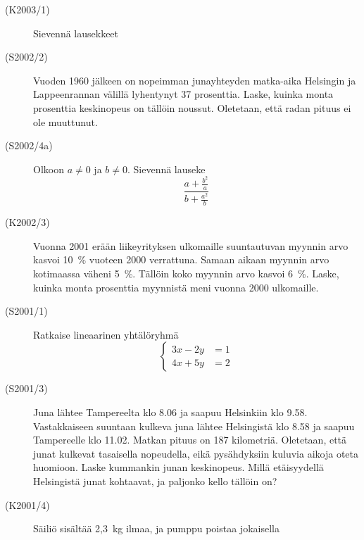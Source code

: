 \begin{description}
    \item[(K2003/1)]   Sievennä lausekkeet
        \begin{alakohdat}
        \end{alakohdat}
    \item[(S2002/2)]   Vuoden 1960 jälkeen on nopeimman junayhteyden matka-aika Helsingin ja Lappeenrannan välillä lyhentynyt 37 prosenttia. Laske, kuinka monta prosenttia keskinopeus on tällöin noussut. Oletetaan, että radan pituus ei ole muuttunut.
    \item[(S2002/4a)]  Olkoon $ a \neq 0$ ja $b \neq 0 $. Sievennä lauseke
                        \[
                            \frac{a + \frac{b^2}{a} } {b + \frac{a^2}{b} }
                        \]
    \item[(K2002/3)]   Vuonna 2001 erään liikeyrityksen ulkomaille suuntautuvan
                        myynnin arvo kasvoi 10~\% vuoteen 2000 verrattuna. Samaan
                        aikaan myynnin arvo kotimaassa väheni 5~\%. Tällöin koko
                        myynnin arvo kasvoi 6~\%. Laske, kuinka monta prosenttia
                        myynnistä meni vuonna 2000 ulkomaille.
    \item[(S2001/1)]   Ratkaise lineaarinen yhtälöryhmä
                       \[
                         \left\{
                          \begin{aligned}
                             3x - 2y &= 1 \\
                             4x + 5y &= 2                      
                         \end{aligned}
                         \right.
                       \]
    \item[(S2001/3)]   Juna lähtee Tampereelta klo 8.06 ja saapuu Helsinkiin klo 9.58.
                        Vastakkaiseen suuntaan kulkeva juna lähtee Helsingistä klo 8.58
                        ja saapuu Tampereelle klo 11.02. Matkan pituus on 187 kilometriä.
                        Oletetaan, että junat kulkevat tasaisella nopeudella, eikä
                        pysähdyksiin kuluvia aikoja oteta huomioon. Laske kummankin
                        junan keskinopeus. Millä etäisyydellä Helsingistä junat
                        kohtaavat, ja paljonko kello tällöin on? 
    \item[(K2001/4)]   Säiliö sisältää 2,3~kg ilmaa, ja pumppu poistaa jokaisella

\end{description}
